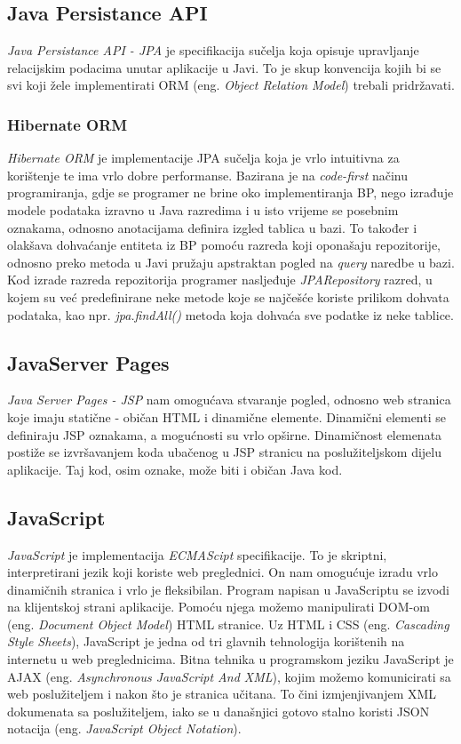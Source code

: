 \documentclass[zavrsni, numeric]{fer}
\begin{document}
\subsection{Java Persistance API}
\textit{Java Persistance API - JPA}\citep{jpa} je specifikacija sučelja koja opisuje upravljanje relacijskim podacima unutar aplikacije u Javi. To je skup konvencija kojih bi se svi koji žele implementirati ORM (eng. \textit{Object Relation Model}) trebali pridržavati.

\subsubsection{Hibernate ORM}
\textit{Hibernate ORM}\citep{hibernate} je implementacije JPA sučelja koja je vrlo intuitivna za korištenje te ima vrlo dobre performanse. Bazirana je na \textit{code-first} načinu programiranja, gdje se programer ne brine oko implementiranja BP, nego izrađuje modele podataka izravno u Java razredima i u isto vrijeme se posebnim oznakama, odnosno anotacijama definira izgled tablica u bazi. To također i olakšava dohvaćanje entiteta iz BP pomoću razreda koji oponašaju repozitorije, odnosno preko metoda u Javi pružaju apstraktan pogled na \textit{query} naredbe u bazi. Kod izrade razreda repozitorija programer nasljeđuje \textit{JPARepository} razred, u kojem su već predefinirane neke metode koje se najčešće koriste prilikom dohvata podataka, kao npr. \textit{jpa.findAll()} metoda koja dohvaća sve podatke iz neke tablice.

\subsection{JavaServer Pages}
\textit{Java Server Pages - JSP}\citep{jsp} nam omogućava stvaranje pogled, odnosno web stranica koje imaju statične - običan HTML i dinamične elemente. Dinamični elementi se definiraju JSP oznakama, a mogućnosti su vrlo opširne. Dinamičnost elemenata postiže se izvršavanjem koda ubačenog u JSP stranicu na poslužiteljskom dijelu aplikacije. Taj kod, osim oznake, može biti i običan Java kod.

\subsection{JavaScript}
\textit{JavaScript} je implementacija \textit{ECMAScipt}\citep{ecma-script} specifikacije. To je skriptni, interpretirani jezik koji koriste web preglednici. On nam omogućuje izradu vrlo dinamičnih stranica i vrlo je fleksibilan. Program napisan u JavaScriptu se izvodi na klijentskoj strani aplikacije. Pomoću njega možemo manipulirati DOM-om (eng. \textit{Document Object Model}) HTML stranice. Uz HTML i CSS (eng. \textit{Cascading Style Sheets}), JavaScript je jedna od tri glavnih tehnologija korištenih na internetu u web preglednicima. Bitna tehnika u programskom jeziku JavaScript je AJAX (eng. \textit{Asynchronous JavaScript And XML}), kojim možemo komunicirati sa web poslužiteljem i nakon što je stranica učitana. To čini izmjenjivanjem XML dokumenata sa poslužiteljem, iako se u današnjici gotovo stalno koristi JSON notacija (eng. \textit{JavaScript Object Notation}). 
\end{document}
